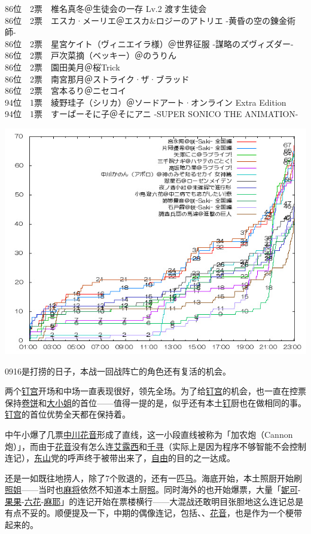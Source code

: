 { 86位　2票　椎名真冬＠生徒会の一存 Lv.2 渡す生徒会\\
 86位　2票　エスカ·メーリエ＠エスカ\&ロジーのアトリエ -黄昏の空の錬金術師-\\
 86位　2票　星宮ケイト（ヴィニエイラ様）＠世界征服 -謀略のズヴィズダー-\\
 86位　2票　戸次菜摘（ベッキー）＠のうりん\\
 86位　2票　園田美月＠桜Trick\\
 86位　2票　南宮那月＠ストライク·ザ·ブラッド\\
 86位　2票　宮本るり＠ニセコイ\\
 94位　1票　綾野珪子（シリカ）＠ソードアート·オンライン Extra Edition\\
 94位　1票　すーぱーそに子＠そにアニ -SUPER SONICO THE ANIMATION-
}

\includegraphics[width=.8\textwidth]{images/graph0916.jpg}

0916是打捞的日子，本战一回战阵亡的角色还有复活的机会。

两个\uline{钉宫}开场和中场一直表现很好，领先全场。为了给\uline{钉宫}的机会，也一直在控票保持\uline{卷饼}和\uline{大小姐}的首位——值得一提的是，似乎还有本土\uline{钉}厨也在做相同的事。\uline{钉宫}的首位优势全天都在保持着。

中午小爆了几票\uline{中川花音}形成了直线，这一小段直线被称为「加农炮（Cannon炮）」，而由于\uline{花音}没有怎么连\uline{艾露西}和\uline{千寻}（实际上是因为程序不够智能不会控制连记），\uline{东山}党的呼声终于被带出来了，\uline{自由}的目的之一达成。

还是一如既往地捞人，除了7个败退的，还有一匹\uline{马}。海底开始，本土照厨开始刷\uline{照姐}——当时也\uline{麻将}依然不知道本土厨\uline{照}。同时海外的也开始爆票，大量「\uline{妮可}-\uline{果果}-\uline{六花}-\uline{麻耶}」的连记开始在票楼横行——大混战还敢明目张胆地这么连记总是有点不妥的。顺便提及一下，中期的偶像连记，包括、、\uline{花音}，也是作为一个梗带起来的。\\

